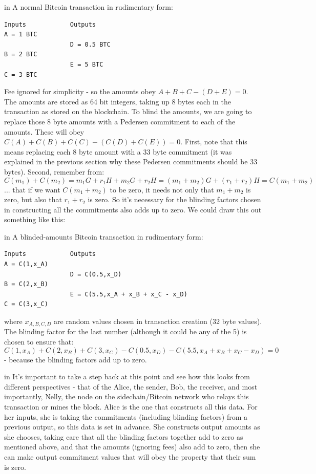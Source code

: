 \documentclass[10pt,a4paper]{article}
\begin{document}
 in \noindent A normal Bitcoin transaction in rudimentary form:
\begin{verbatim}
Inputs            Outputs
A = 1 BTC
                  D = 0.5 BTC
B = 2 BTC
                  E = 5 BTC
C = 3 BTC
\end{verbatim}

Fee ignored for simplicity - so the amounts obey $A + B + C - (D + E) = 0$. The amounts are stored as 64 bit integers, taking up 8 bytes each in the transaction as stored on the blockchain. To blind the amounts, we are going to replace those 8 byte amounts with a Pedersen commitment to each of the amounts. These will obey $C(A) + C(B) + C(C) - (C(D) + C(E)) = 0$. First, note that this means replacing each 8 byte amount with a 33 byte commitment (it was explained in the previous section why these Pedersen commitments should be 33 bytes). Second, remember from:
\[C(m_1) + C(m_2) = m_{1}G + r_{1}H + m_{2}G +r_{2}H = (m_1+m_2)G +(r_1 + r_2)H = C(m_1+m_2) \]
... that if we want $C(m_1 + m_2 )$ to be zero, it needs not only that $m_1 + m_2 $ is zero, but also that $r_1 + r_2 $ is zero. So it's necessary for the blinding factors chosen in constructing all the commitments also adds up to zero. We could draw this out something like this:

 in \noindent A blinded-amounts Bitcoin transaction in rudimentary form:
\begin{verbatim}
Inputs            Outputs
A = C(1,x_A)
                  D = C(0.5,x_D)
B = C(2,x_B)
                  E = C(5.5,x_A + x_B + x_C - x_D)
C = C(3,x_C)
\end{verbatim}

where $x_{A,B,C,D}$ are random values chosen in transaction creation (32 byte values). The blinding factor for the last number (although it could be any of the 5) is chosen to ensure that:
\[C(1,x_A) + C(2,x_B) + C(3,x_C) - C(0.5,x_D) - C(5.5,x_A + x_B + x_C - x_D) = 0\]
- because the blinding factors add up to zero.

 in \noindent It's important to take a step back at this point and see how this looks from different perspectives - that of the Alice, the sender, Bob, the receiver, and most importantly, Nelly, the node on the sidechain/Bitcoin network who relays this transaction or mines the block. Alice is the one that constructs all this data. For her inputs, she is taking the commitments (including blinding factors) from a previous output, so this data is set in advance. She constructs output amounts as she chooses, taking care that all the blinding factors together add to zero as mentioned above, and that the amounts (ignoring fees) also add to zero, then she can make output commitment values that will obey the property that their sum is zero.
\end{document}
